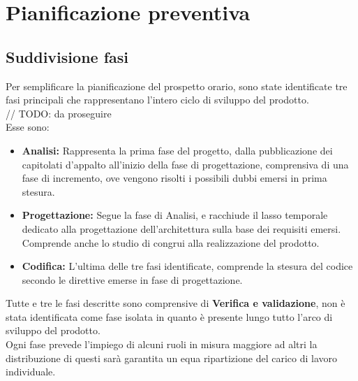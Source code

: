 \documentclass{scalatekids-article}
\begin{document}
\section{Pianificazione preventiva}
\subsection{Suddivisione fasi}
Per semplificare la pianificazione del prospetto orario, sono state identificate
tre fasi principali che rappresentano l'intero ciclo di sviluppo del prodotto.\\
// TODO: da proseguire\\
Esse sono:
\begin{itemize}
\item\textbf{Analisi:} Rappresenta la prima fase del progetto, dalla
  pubblicazione dei capitolati d'appalto all'inizio della fase di progettazione,
  comprensiva di una fase di incremento, ove vengono risolti i possibili dubbi
  emersi in prima stesura.
\item\textbf{Progettazione:} Segue la fase di Analisi, e racchiude il lasso
  temporale dedicato alla progettazione dell'architettura sulla base dei requisiti
  emersi. Comprende anche lo studio di  congrui alla realizzazione
  del prodotto.
\item\textbf{Codifica:} L'ultima delle tre fasi identificate, comprende la stesura
  del codice secondo le direttive emerse in fase di progettazione.
\end{itemize}
Tutte e tre le fasi descritte sono comprensive di \textbf{Verifica e validazione},
non è stata identificata come fase isolata in quanto è presente lungo tutto l'arco
di sviluppo del prodotto.\\
Ogni fase prevede l'impiego di alcuni ruoli in misura maggiore ad altri la distribuzione
di questi sarà garantita un equa ripartizione del carico di lavoro individuale.
\end{document}

